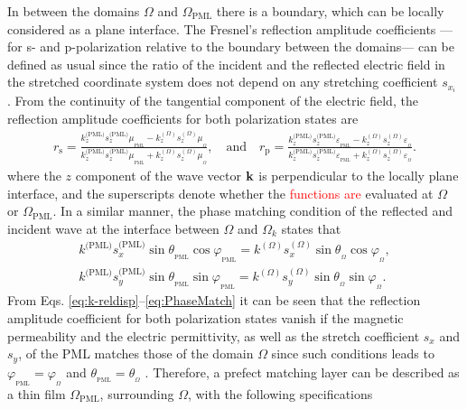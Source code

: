     In between the domains $\Omega$ and $\Omega_\text{PML}$ there is a boundary, which can be locally considered as a plane interface. The Fresnel's reflection amplitude coefficients ---for s- and p-polarization relative to the boundary between the domains--- can be defined as usual since the ratio of the incident and the reflected electric field in the stretched coordinate system does not depend on any stretching coefficient $s_{x_i}$ \cite{jin_theory_2010,chew_complex_1997}. From the continuity of the tangential component of the electric field, the reflection amplitude coefficients for both polarization states are \cite{jackson_classical_1999}
    \begin{align}
       r_\text{s} = \frac{k^\text{(PML)}_z s^\text{(PML)}_z\mu_{{}_\text{PML}} - k^{(\Omega)}_z s^{(\Omega)}_z\mu_{{}_\Omega}}
                        {k^\text{(PML)}_z s^\text{(PML)}_z\mu_{{}_\text{PML}} + k^{(\Omega)}_z s^{(\Omega)}_z\mu_{{}_\Omega}},
           \quad
           \text{and}
           \quad
       r_\text{p} = \frac{k^\text{(PML)}_z s^\text{(PML)}_z\varepsilon_{{}_\text{PML}} - k^{(\Omega)}_z s^{(\Omega)}_z\varepsilon_{{}_\Omega}}
                        {k^\text{(PML)}_z s^\text{(PML)}_z\varepsilon_{{}_\text{PML}} + k^{(\Omega)}_z s^{(\Omega)}_z\varepsilon_{{}_\Omega}}.
       \label{eq:refl-Fresnel}
    \end{align}
   where the $z$ component of the wave vector $\vb{k}$ is perpendicular to the locally plane interface, and the superscripts denote whether the \textcolor{red}{functions are} evaluated at $\Omega$ or $\Omega_\text{PML}$. In a similar manner, the phase matching condition of the reflected and incident wave at the interface between $\Omega$ and $\Omega_k$ states that \cite{jin_theory_2010}
   \begin{subequations}
       \label{eq:PhaseMatch}
    \begin{align}
       k^\text{(PML)} s^\text{(PML)}_x \sin\theta_{{}_\text{PML}}\cos\varphi_{{}_\text{PML}} =
                        k^{(\Omega)} s^{(\Omega)}_x \sin\theta_{{}_\Omega}\cos\varphi_{{}_\Omega},\\
        k^\text{(PML)} s^\text{(PML)}_y \sin\theta_{{}_\text{PML}}\sin\varphi_{{}_\text{PML}} =
                     k^{(\Omega)} s^{(\Omega)}_y \sin\theta_{{}_\Omega}\sin\varphi_{{}_\Omega}.
    \end{align}
    \end{subequations}
    \noindent
   From Eqs. \eqref{eq:k-reldisp}--\eqref{eq:PhaseMatch} it can be seen that the reflection amplitude coefficient for both polarization states vanish if the magnetic permeability and the electric permittivity, as well as the stretch coefficient $s_x$ and $s_y$, of the PML matches those of the domain $\Omega$ since such conditions leads to  $\varphi_{{}_\text{PML}} = \varphi_{{}_\Omega}$ and  $\theta_{{}_\text{PML}} = \theta_{{}_\Omega}$ \cite{jin_theory_2010}. Therefore, a prefect matching layer can be described as a thin film $\Omega_\text{PML}$, surrounding $\Omega$, with the following specifications
